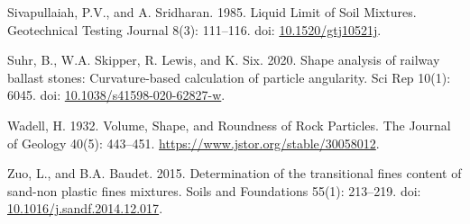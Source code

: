 \documentclass[
  letterpaper,
]{article}
\newlength{\cslhangindent}
\newlength{\cslentryspacingunit} %
\newenvironment{CSLReferences}[2] %
 {%
  \setlength{\parindent}{0pt}
  \ifodd #1
  \let\oldpar\par
  \def\par{\hangindent=\cslhangindent\oldpar}
  \fi
  \setlength{\parskip}{#2\cslentryspacingunit}
 }%
 {}
\begin{document}
\begin{CSLReferences}{1}{0}
\leavevmode{}%
Sivapullaiah, P.V., and A. Sridharan. 1985. Liquid {Limit} of {Soil Mixtures}. Geotechnical Testing Journal 8(3): 111--116. doi: \href{https://doi.org/10.1520/gtj10521j}{10.1520/gtj10521j}.

\leavevmode{}%
Suhr, B., W.A. Skipper, R. Lewis, and K. Six. 2020. Shape analysis of railway ballast stones: Curvature-based calculation of particle angularity. Sci Rep 10(1): 6045. doi: \href{https://doi.org/10.1038/s41598-020-62827-w}{10.1038/s41598-020-62827-w}.

\leavevmode{}%
Wadell, H. 1932. Volume, {Shape}, and {Roundness} of {Rock Particles}. The Journal of Geology 40(5): 443--451. \url{https://www.jstor.org/stable/30058012}.

\leavevmode{}%
Zuo, L., and B.A. Baudet. 2015. Determination of the transitional fines content of sand-non plastic fines mixtures. Soils and Foundations 55(1): 213--219. doi: \href{https://doi.org/10.1016/j.sandf.2014.12.017}{10.1016/j.sandf.2014.12.017}.

\end{CSLReferences}
\end{document}
